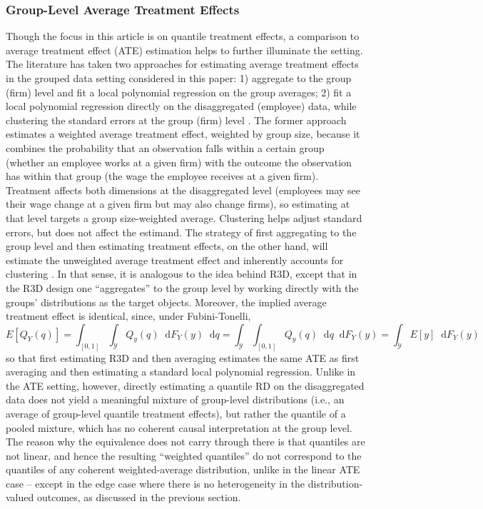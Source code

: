 \documentclass[12pt]{article}
\newcommand*\dd{\mathop{}\!\mathrm{d}}
\begin{document}
\subsubsection{Group-Level Average Treatment Effects} \label{sec:comparison_ate}

Though the focus in this article is on quantile treatment effects, a comparison to average treatment effect (ATE) estimation helps to further illuminate the setting. The literature has taken two approaches for estimating average treatment effects in the grouped data setting considered in this paper: 1) aggregate to the group (firm) level and fit a local polynomial regression on the group averages; 2) fit a local polynomial regression directly on the disaggregated (employee) data, while clustering the standard errors at the group (firm) level \citep{bartalotti2017regression}. The former approach estimates a weighted average treatment effect, weighted by group size, because it combines the probability that an observation falls within a certain group (whether an employee works at a given firm) with the outcome the observation has within that group (the wage the employee receives at a given firm). Treatment affects both dimensions at the disaggregated level (employees may see their wage change at a given firm but may also change firms), so estimating at that level targets a group size-weighted average. Clustering helps adjust standard errors, but does not affect the estimand. The strategy of first aggregating to the group level and then estimating treatment effects, on the other hand, will estimate the unweighted average treatment effect and inherently accounts for clustering \citep{bartalotti2017regression}. In that sense, it is analogous to the idea behind R3D, except that in the R3D design one ``aggregates'' to the group level by working directly with the groups' distributions as the target objects. Moreover, the implied average treatment effect is identical, since, under Fubini-Tonelli,
\[
E[Q_Y(q)] = \int_{[0,1]} \int_{\mathcal{Y}} Q_y(q) \dd F_Y(y) \dd q =  \int_{\mathcal{Y}}\int_{[0,1]} Q_y(q) \dd q  \dd F_Y(y) = \int_{\mathcal{Y}} E[y] \dd F_Y(y) 
\]
so that first estimating R3D and then averaging estimates the same ATE as first averaging and then estimating a standard local polynomial regression. Unlike in the ATE setting, however, directly estimating a quantile RD on the disaggregated data does not yield a meaningful mixture of group-level distributions (i.e., an average of group-level quantile treatment effects), but rather the quantile of a pooled mixture, which has no coherent causal interpretation at the group level. The reason why the equivalence does not carry through there is that quantiles are not linear, and hence the resulting ``weighted quantiles'' do not correspond to the quantiles of any coherent weighted-average distribution, unlike in the linear ATE case -- except in the edge case where there is no heterogeneity in the distribution-valued outcomes, as discussed in the previous section. 
\end{document}
